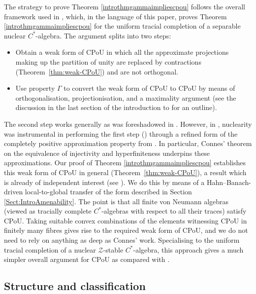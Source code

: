 \documentclass[a4paper,11pt]{amsart}
\theoremstyle{definition}
\numberwithin{equation}{section}
\numberwithin{theorem}{section}
\begin{document}
The strategy to prove Theorem \ref{introthmgammaimpliescpou} follows the overall  framework used in \cite{CETWW}, which, in the language of this paper, proves Theorem \ref{introthmgammaimpliescpou} for the uniform tracial completion of a separable nuclear $C^*$-algebra.  The argument splits into two steps:
\begin{itemize}
    \item Obtain a weak form of CPoU in which all the approximate projections making up the partition of unity are replaced by contractions (Theorem~\ref{thm:weak-CPoU}) and are not orthogonal.  
    \item Use property $\Gamma$ to convert the weak form of CPoU to CPoU by means of orthogonalisation, projectionisation, and a maximality argument (see the discussion in the last section of the introduction to \cite{CETWW} for an outline).
\end{itemize}
The second step works generally as was foreshadowed in \cite[Lemma 3.7]{CETWW}. However, in \cite{CETWW}, nuclearity was instrumental in performing the first step (\cite[Lemma 3.6]{CETWW}) through a refined form of the completely positive approximation property from \cite{BCW16}.  In particular, Connes' theorem on the equivalence of injectivity and hyperfiniteness underpins these approximations.  Our proof of Theorem \ref{introthmgammaimpliescpou} establishes this weak form of CPoU in general (Theorem~\ref{thm:weak-CPoU}), a result which is already of independent interest (see \cite{SW23,WoutersPhd}).
 We do this by means of a Hahn--Banach-driven local-to-global transfer of the form described in Section \ref{Sect:IntroAmenability}. The point is that all finite von Neumann algebras (viewed as tracially complete $C^*$-algebras with respect to all their traces) satisfy CPoU. Taking suitable convex combinations of the elements witnessing CPoU in finitely many fibres gives rise to the required weak form of CPoU, and we do not need to rely on anything as deep as Connes' work.  Specialising to the uniform tracial completion of a nuclear $\mathcal Z$-stable $C^*$-algebra, this approach gives a much simpler overall argument for CPoU as compared with \cite{CETWW}.
















\subsection{Structure and classification}\label{Intro:StructureClass}
\end{document}
